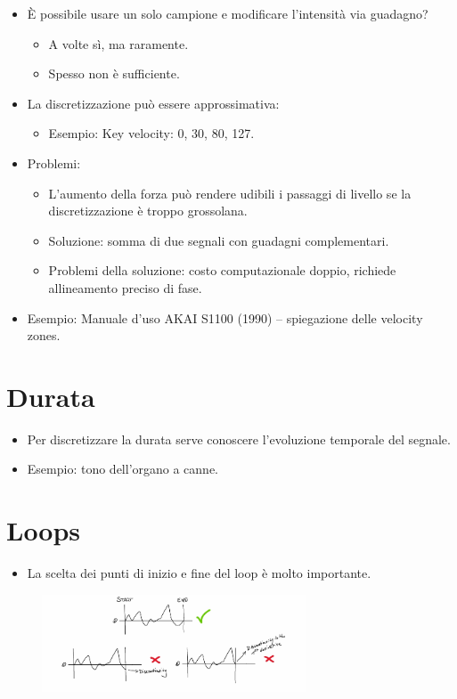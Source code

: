 \begin{itemize}
    \item È possibile usare un solo campione e modificare l’intensità via guadagno?
    \begin{itemize}
        \item A volte sì, ma raramente.
        \item Spesso non è sufficiente.
    \end{itemize}
    \item La discretizzazione può essere approssimativa:
    \begin{itemize}
        \item Esempio: Key velocity: 0, 30, 80, 127.
    \end{itemize}
    \item Problemi:
    \begin{itemize}
        \item L'aumento della forza può rendere udibili i passaggi di livello se la discretizzazione è troppo grossolana.
        \item Soluzione: somma di due segnali con guadagni complementari.
        \item Problemi della soluzione: costo computazionale doppio, richiede allineamento preciso di fase.
    \end{itemize}
    \item Esempio: Manuale d’uso AKAI S1100 (1990) – spiegazione delle velocity zones.
\end{itemize}

\section{Durata}

\begin{itemize}
    \item Per discretizzare la durata serve conoscere l’evoluzione temporale del segnale.
    \item Esempio: tono dell'organo a canne.
\end{itemize}

\section{Loops}

\begin{itemize}
    \item La scelta dei punti di inizio e fine del loop è molto importante.
\end{itemize}
\begin{figure}[H]
    \centering
    \includegraphics[width=0.7\textwidth]{capitoli/capitolo13/immagini/image4.jpeg}
\end{figure}


